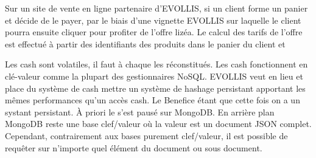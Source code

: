 Sur un site de vente en ligne partenaire d'EVOLLIS, si un client forme un panier et décide de le payer, par le biais d'une vignette EVOLLIS sur laquelle le client pourra ensuite cliquer pour profiter de l'offre \textsf{lizéa}. Le calcul des tarifs de l'offre est effectué  à partir des identifiants des produits dans le panier du client et    







Les cash sont volatiles, il faut à chaque les réconstitués. Les cash
fonctionnent en clé-valeur comme la plupart des gestionnaires NoSQL.
EVOLLIS veut en lieu et place du système de cash mettre un système de
hashage persistant apportant les mêmes performances qu'un accès cash.
Le Benefice étant que cette fois on a un systant persistant. À priori
le s'est pausé sur MongoDB. En arrière plan MongoDB reste une base
clef/valeur où la valeur est un document JSON complet. Cependant,
contrairement aux bases purement clef/valeur, il est possible de
requêter sur n’importe quel élément du document ou sous document.
